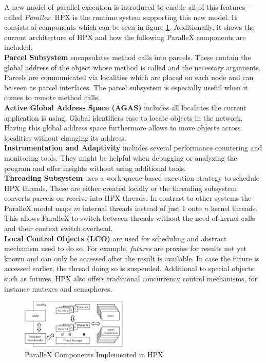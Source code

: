   
  A new model of parallel execution is introduced to enable all of this features --- called \textit{Parallex}.
  HPX is the runtime system supporting this new model.
  It consists of components which can be seen in figure \ref{fig:HPXcomp}.
  Additionally, it shows the current architecture of HPX and how the following ParalleX components are included.~\cite{Kaiser.2009}\\
  \textbf{Parcel Subsystem} encapsulates method calls into parcels.
  These contain the global address of the object whose method is called and the necessary arguments.
  Parcels are communicated via localities which are placed on each node and can be seen as parcel interfaces.
  The parcel subsystem is especially useful when it comes to remote method calls.\\
  \textbf{Active Global Address Space (AGAS)} includes all localities the current application is using.
  Global identifiers ease to locate objects in the network.
  Having this global address space furthermore allows to move objects across localities without changing its address.\\  
  \textbf{Instrumentation and Adaptivity} includes several performance countering and monitoring tools.
  They might be helpful when debugging or analyzing the program and offer insights without using additional tools.\\
  \textbf{Threading Subsystem} uses a work-queue based execution strategy to schedule HPX threads.
  These are either created locally or the threading subsystem converts parcels on receive into HPX threads.
  In contrast to other systems the ParalleX model maps \(m\) internal threads instead of just 1 onto \(n\) kernel threads.
  This allows ParalleX to switch between threads without the need of kernel calls and their context switch overhead.\\  
  \textbf{Local Control Objects (LCO)} are used for scheduling and abstract mechanism used to do so.
  For example, \textit{futures} are proxies for results not yet known and can only be accessed after the result is available.
  In case the future is accessed earlier, the thread doing so is suspended.
  Additional to special objects such as futures, HPX also offers traditional concurrency control mechanisms, for instance mutexes and semaphores.
\begin{figure}[htbp]
	\centering
	\includegraphics[width=0.45\textwidth]{figures/parallexArchitecture.JPG}
	\caption{ParalleX Components Implemented in HPX~\cite{Kaiser.2009}}
	\label{fig:HPXcomp}
\end{figure}
  	
